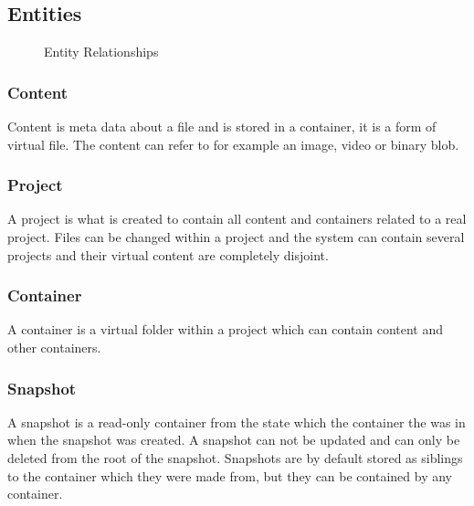 \documentclass[a4paper,12pt]{article}
\begin{document}
\subsection{Entities}
\begin{figure}[htp] 
    \caption{Entity Relationships}
    \label{fig:relation}
\end{figure}

\subsubsection{Content}
Content is meta data about a file and is stored in a container, it is a form of virtual file.
The content can refer to for example an image, video or binary blob.

\subsubsection{Project}
A project is what is created to contain all content and containers related to a real project. Files can be changed 
within a project and the system can contain several projects and their virtual content are completely disjoint.

\subsubsection{Container}
A container is a virtual folder within a project which can contain content and other containers.

\subsubsection{Snapshot}
A snapshot is a read-only container from the state which the container the was in when the snapshot was created. 
A snapshot can not be updated and can only be deleted from the root of the snapshot. Snapshots are by default stored 
as siblings to the container which they were made from, but they can be contained by any container.
\end{document}
